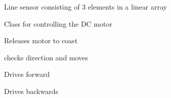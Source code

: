 \documentclass[letterpaper,10pt,english]{sphinxmanual}
\begin{document}
\begin{fulllineitems}
\label{\detokenize{index:picar.LineSensor}}
Line sensor consisting of 3 elements in a linear array

\end{fulllineitems}


\begin{fulllineitems}
\label{\detokenize{index:picar.Motor}}
Class for controlling the DC motor

\begin{fulllineitems}
\label{\detokenize{index:picar.Motor.coast}}
Releases motor to coast

\end{fulllineitems}


\begin{fulllineitems}
\label{\detokenize{index:picar.Motor.drive}}
checks direction and moves

\end{fulllineitems}


\begin{fulllineitems}
\label{\detokenize{index:picar.Motor.forward}}
Drives forward

\end{fulllineitems}


\begin{fulllineitems}
\label{\detokenize{index:picar.Motor.reverse}}
Drives backwards


\end{fulllineitems}
\end{fulllineitems}
\end{document}
